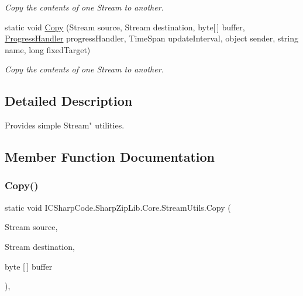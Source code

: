 \begin{DoxyCompactItemize}
\begin{DoxyCompactList}\small\item\em Copy the contents of one Stream to another. \end{DoxyCompactList}\item 
static void \hyperlink{class_i_c_sharp_code_1_1_sharp_zip_lib_1_1_core_1_1_stream_utils_ace932da98ae2c60d45deb7db4d9e1c02}{Copy} (Stream source, Stream destination, byte\mbox{[}$\,$\mbox{]} buffer, \hyperlink{namespace_i_c_sharp_code_1_1_sharp_zip_lib_1_1_core_a55f409bd1114da81c14d18c4d8682968}{Progress\+Handler} progress\+Handler, Time\+Span update\+Interval, object sender, string name, long fixed\+Target)
\begin{DoxyCompactList}\small\item\em Copy the contents of one Stream to another. \end{DoxyCompactList}\end{DoxyCompactItemize}


\subsection{Detailed Description}
Provides simple Stream" utilities. 



\subsection{Member Function Documentation}
\mbox{\label{class_i_c_sharp_code_1_1_sharp_zip_lib_1_1_core_1_1_stream_utils_a4d28bd20f4b154a766948f7bb35e8788}} 
\subsubsection{\texorpdfstring{Copy()}{Copy()}\hspace{0.1cm}{\footnotesize\ttfamily [1/3]}}
{\footnotesize\ttfamily static void I\+C\+Sharp\+Code.\+Sharp\+Zip\+Lib.\+Core.\+Stream\+Utils.\+Copy (\begin{DoxyParamCaption}\item[{Stream}]{source,  }\item[{Stream}]{destination,  }\item[{byte \mbox{[}$\,$\mbox{]}}]{buffer }\end{DoxyParamCaption})\hspace{0.3cm}{\ttfamily [inline]}, {\ttfamily [static]}}



